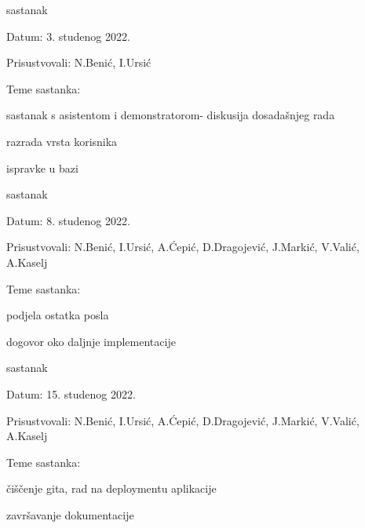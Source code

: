 \begin{packed_enum}
                \item  sastanak
			\item[] \begin{packed_item}
				\item Datum: 3. studenog 2022.
				\item Prisustvovali: N.Benić, I.Ursić
				\item Teme sastanka:
				\begin{packed_item}
					\item  sastanak s asistentom i demonstratorom- diskusija dosadašnjeg rada
					\item  razrada vrsta korisnika
                        \item ispravke u bazi
				\end{packed_item}
			\end{packed_item}

                \item  sastanak
			\item[] \begin{packed_item}
				\item Datum: 8. studenog 2022.
				\item Prisustvovali: N.Benić, I.Ursić, A.Ćepić, D.Dragojević, J.Markić, V.Valić, A.Kaselj 
				\item Teme sastanka:
				\begin{packed_item}
					\item podjela ostatka posla
					\item  dogovor oko daljnje implementacije
				\end{packed_item}
			\end{packed_item}

                \eject

                \item  sastanak
			\item[] \begin{packed_item}
				\item Datum: 15. studenog 2022.
				\item Prisustvovali: N.Benić, I.Ursić, A.Ćepić, D.Dragojević, J.Markić, V.Valić, A.Kaselj 
				\item Teme sastanka:
				\begin{packed_item}
					\item čiščenje gita, rad na deploymentu aplikacije
					\item  završavanje dokumentacije
				\end{packed_item}
			\end{packed_item}


\end{packed_enum}

